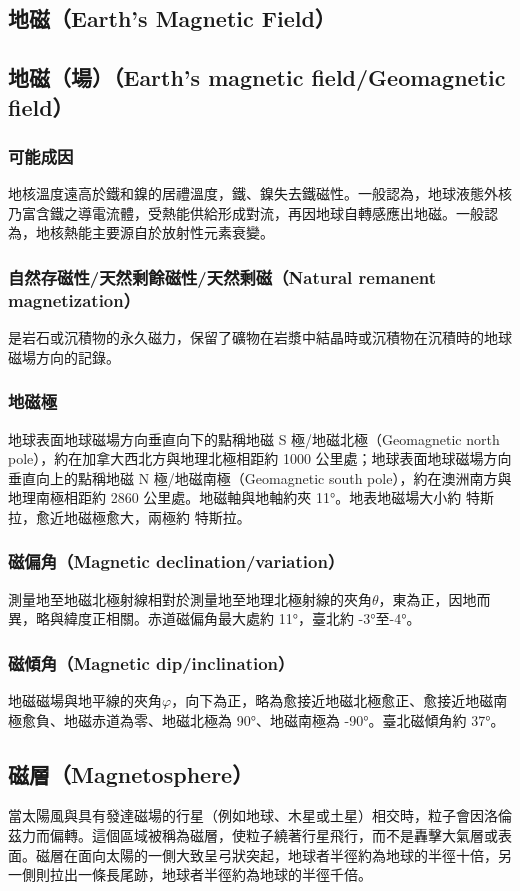 \documentclass[a4paper,12pt]{report}
\begin{document}
\begin{itemize}
\section{地磁（Earth's Magnetic Field）}
\subsection{地磁（場）（Earth's magnetic field/Geomagnetic field）}
\subsubsection{可能成因}
地核溫度遠高於鐵和鎳的居禮溫度，鐵、鎳失去鐵磁性。一般認為，地球液態外核乃富含鐵之導電流體，受熱能供給形成對流，再因地球自轉感應出地磁。一般認為，地核熱能主要源自於放射性元素衰變。
\subsubsection{自然存磁性/天然剩餘磁性/天然剩磁（Natural remanent magnetization）}
是岩石或沉積物的永久磁力，保留了礦物在岩漿中結晶時或沉積物在沉積時的地球磁場方向的記錄。
\subsubsection{地磁極}
地球表面地球磁場方向垂直向下的點稱地磁 S 極/地磁北極（Geomagnetic north pole），約在加拿大西北方與地理北極相距約 1000 公里處；地球表面地球磁場方向垂直向上的點稱地磁 N 極/地磁南極（Geomagnetic south pole），約在澳洲南方與地理南極相距約 2860 公里處。地磁軸與地軸約夾 11°。地表地磁場大小約  特斯拉，愈近地磁極愈大，兩極約  特斯拉。
\subsubsection{磁偏角（Magnetic declination/variation）}
測量地至地磁北極射線相對於測量地至地理北極射線的夾角$\theta$，東為正，因地而異，略與緯度正相關。赤道磁偏角最大處約 11°，臺北約 -3°至-4°。
\subsubsection{磁傾角（Magnetic dip/inclination） }
地磁磁場與地平線的夾角$\varphi$，向下為正，略為愈接近地磁北極愈正、愈接近地磁南極愈負、地磁赤道為零、地磁北極為 90°、地磁南極為 -90°。臺北磁傾角約 37°。
\subsection{磁層（Magnetosphere）}
當太陽風與具有發達磁場的行星（例如地球、木星或土星）相交時，粒子會因洛倫茲力而偏轉。這個區域被稱為磁層，使粒子繞著行星飛行，而不是轟擊大氣層或表面。磁層在面向太陽的一側大致呈弓狀突起，地球者半徑約為地球的半徑十倍，另一側則拉出一條長尾跡，地球者半徑約為地球的半徑千倍。

\end{itemize}
\end{document}

